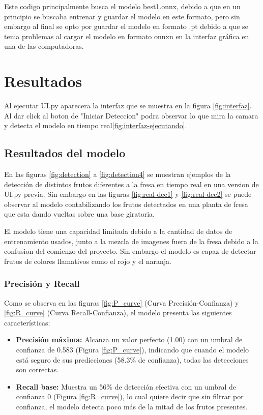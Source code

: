 \documentclass[conference]{IEEEtran}
\begin{document}
Este codigo principalmente busca el modelo best1.onnx, debido a que en un principio se buscaba entrenar y guardar el modelo en este formato, pero sin embargo al final se opto por guardar el modelo en formato .pt debido a que se tenia problemas al cargar el modelo en formato onnxn en la interfaz gráfica en una de las computadoras.

\section{Resultados}
Al ejecutar UI.py aparecera la interfaz que se muestra en la figura \ref{fig:interfaz}. Al dar click al boton de "Iniciar Deteccion" podra observar lo que mira la camara y detecta el modelo en tiempo real\ref{fig:interfaz-ejecutando}.


\subsection{Resultados del modelo}
En las figuras \ref{fig:detection} a \ref{fig:detection4} se muestran ejemplos de la detección de distintos frutos diferentes a la fresa en tiempo real en una version de UI.py previa. Sin embargo en las figuras \ref{fig:real-dec1} y \ref{fig:real-dec2} se puede observar al modelo contabilizando los frutos detectados en una planta de fresa que esta dando vueltas sobre una base giratoria.

El modelo tiene una capacidad limitada debido a la cantidad de datos de entrenamiento usados, junto a la mezcla de imagenes fuera de la fresa debido a la confusion del comienzo del proyecto. Sin embargo el modelo es capaz de detectar frutos de colores llamativos como el rojo y el naranja. 

\subsubsection{Precisión y Recall}
Como se observa en las figuras \ref{fig:P_curve} (Curva Precisión-Confianza) y \ref{fig:R_curve} (Curva Recall-Confianza), el modelo presenta las siguientes características:

\begin{itemize}
\item \textbf{Precisión máxima:} Alcanza un valor perfecto (1.00) con un umbral de confianza de 0.583 (Figura \ref{fig:P_curve}), indicando que cuando el modelo está seguro de sus predicciones (58.3\% de confianza), todas las detecciones son correctas.
\item \textbf{Recall base:} Muestra un 56\% de detección efectiva con un umbral de confianza 0 (Figura \ref{fig:R_curve}), lo cual quiere decir que sin filtrar por confianza, el modelo detecta poco más de la mitad de los frutos presentes.
\end{itemize}
\end{document}

